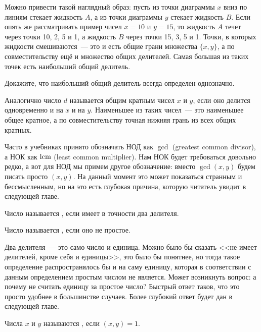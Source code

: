 Можно привести такой наглядный образ: пусть из точки диаграммы $x$ вниз по линиям стекает жидкость $A$, а из точки диаграммы $y$ стекает жидкость $B$. Если опять же рассматривать пример чисел $x=10$ и $y=15$, то жидкость $A$ течет через точки 10, 2, 5 и 1, а жидкость $B$ через точки 15, 3, 5 и 1. Точки, в которых жидкости смешиваются~--- это и есть общие грани множества $\{x, y\}$, а по совместительству ещё и множество общих делителей. Самая большая из таких точек есть наибольший общий делитель.

\begin{exercise}
Докажите, что наибольший общий делитель всегда определен однозначно.
\end{exercise}

Аналогично число $d$ называется общим кратным чисел $x$ и $y$, если оно делится одновременно и на $x$ и на $y$. Наименьшее из таких чисел~--- это наименьшее общее кратное, а по совместительству точная нижняя грань из всех общих кратных.

Часто в учебниках принято обозначать НОД как $\gcd$ (greatest common divisor), а НОК как $\operatorname{lcm}$ (least common multiplier). Нам НОК будет требоваться довольно редко, а вот для НОД мы примем другое обозначение: вместо $\gcd(x, y)$ будем писать просто $(x, y)$. На данный момент это может показаться странным и бессмысленным, но на это есть глубокая причина, которую читатель увидит в следующей главе.

\begin{definition}
Число называется , если имеет в точности два делителя.
\end{definition}

\begin{definition}
Число называется , если оно не простое.
\end{definition}

Два делителя~--- это само число и единица. Можно было бы сказать <<не имеет делителей, кроме себя и единицы>>, это было бы понятнее, но тогда такое определение распространялось бы и на саму единицу, которая в соответствии с данным определением простым числом не является. Может возникнуть вопрос: а почему не считать единицу за простое число? Быстрый ответ таков, что это просто удобнее в большинстве случаев. Более глубокий ответ будет дан в следующей главе.

\begin{definition}
Числа $x$ и $y$ называются , если $(x, y) = 1$.
\end{definition}

